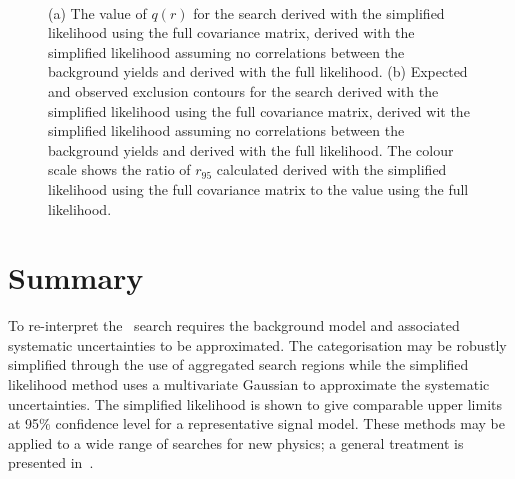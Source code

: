 \begin{figure}[]
  \begin{center} 
   ~~
   \\
   \caption{(a) The value of $q(r)$ for the \alphat search derived with the simplified 
   likelihood using the full covariance matrix, derived with the simplified likelihood 
   assuming no correlations between the background yields and 
   derived with the full likelihood. (b) Expected and observed exclusion contours for the \alphat search
   derived with the simplified likelihood using the full covariance matrix,
   derived wit the simplified likelihood assuming no correlations between the background yields
   and derived with the full likelihood. The colour scale shows the ratio of $r_{95}$ calculated 
   derived with the simplified likelihood using the full covariance matrix to the value using the full likelihood.}
   \label{fig:likelihoodscanAT} 
  \end{center}
\end{figure}

\section{Summary}

To re-interpret the \alphat~search requires the background model and associated
systematic uncertainties to be approximated. The categorisation may be
robustly simplified through the use of aggregated search regions while the simplified 
likelihood method uses a multivariate Gaussian to approximate the systematic uncertainties.
The simplified likelihood is shown to give comparable upper limits at 95\% confidence 
level for a representative signal model. These methods may be applied to a 
wide range of searches for new physics; a general treatment 
is presented in~\cite{simp-lik}.

